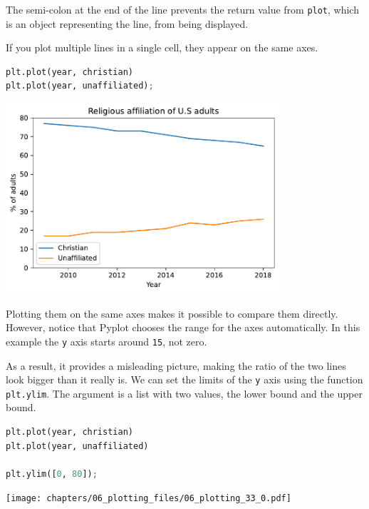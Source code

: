 The semi-colon at the end of the line prevents the return value from
\passthrough{\lstinline!plot!}, which is an object representing the
line, from being displayed.

If you plot multiple lines in a single cell, they appear on the same
axes.

\begin{lstlisting}[language=Python,style=source]
plt.plot(year, christian)
plt.plot(year, unaffiliated);
\end{lstlisting}

\begin{center}
\includegraphics[width=4in]{chapters/06_plotting_files/06_plotting_31_0.pdf}
\end{center}

Plotting them on the same axes makes it possible to compare them
directly. However, notice that Pyplot chooses the range for the axes
automatically. In this example the \passthrough{\lstinline!y!} axis
starts around \passthrough{\lstinline!15!}, not zero.

As a result, it provides a misleading picture, making the ratio of the
two lines look bigger than it really is. We can set the limits of the
\passthrough{\lstinline!y!} axis using the function
\passthrough{\lstinline!plt.ylim!}. The argument is a list with two
values, the lower bound and the upper bound.

\begin{lstlisting}[language=Python,style=source]
plt.plot(year, christian)
plt.plot(year, unaffiliated)

plt.ylim([0, 80]);
\end{lstlisting}

\begin{center}
\texttt{[image: chapters/06\_plotting\_files/06\_plotting\_33\_0.pdf]}
\end{center}


